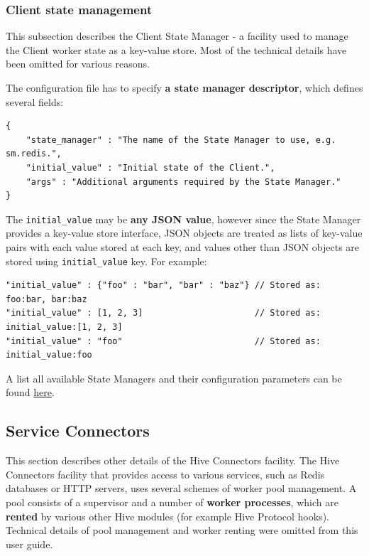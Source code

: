 \documentclass[a4paper]{article}
\begin{document}
\begin{itemize}
\end{itemize} %
\subsubsection{Client state management}
\label{sec-7-1-5}
\label{ref-state_management}

This subsection describes the Client State Manager - a facility used to manage the Client worker state as a key-value store. Most of the technical details have been omitted for various reasons.

\noindent
The configuration file has to specify \textbf{a state manager descriptor}, which defines several fields:


\begin{verbatim}
{
    "state_manager" : "The name of the State Manager to use, e.g. sm.redis.",
    "initial_value" : "Initial state of the Client.",
    "args" : "Additional arguments required by the State Manager."
}
\end{verbatim}




The \texttt{initial\_value} may be \textbf{any JSON value}, however since the State Manager provides a key-value store interface, JSON objects are treated as lists of key-value pairs with each value stored at each key, and values other than JSON objects are stored using \texttt{initial\_value} key. For example:


\begin{verbatim}
"initial_value" : {"foo" : "bar", "bar" : "baz"} // Stored as:  foo:bar, bar:baz
"initial_value" : [1, 2, 3]                      // Stored as: initial_value:[1, 2, 3]
"initial_value" : "foo"                          // Stored as: initial_value:foo
\end{verbatim}




\noindent
A list all available State Managers and their configuration parameters can be found \hyperref[sec-8-5]{here}.
\subsection{Service Connectors}
\label{sec-7-2}

This section describes other details of the Hive Connectors facility. The Hive Connectors facility that provides access to various services, such as Redis databases or HTTP servers, uses several schemes of worker pool management. A pool consists of a supervisor and a number of \textbf{worker processes}, which are \textbf{rented} by various other Hive modules (for example Hive Protocol hooks). Technical details of pool management and worker renting were omitted from this user guide.
\end{document}
